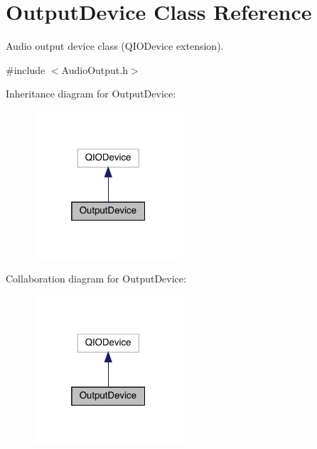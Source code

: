 \hypertarget{class_output_device}{}\section{Output\+Device Class Reference}
\label{class_output_device}


Audio output device class (Q\+I\+O\+Device extension).  




{\ttfamily \#include $<$Audio\+Output.\+h$>$}



Inheritance diagram for Output\+Device\+:
\nopagebreak
\begin{figure}[H]
\begin{center}
\leavevmode
\includegraphics[width=157pt]{class_output_device__inherit__graph}
\end{center}
\end{figure}


Collaboration diagram for Output\+Device\+:
\nopagebreak
\begin{figure}[H]
\begin{center}
\leavevmode
\includegraphics[width=157pt]{class_output_device__coll__graph}
\end{center}
\end{figure}
